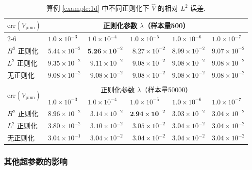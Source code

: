 \begin{table}[hbtp]
\centering
\footnotesize
\caption{算例 \ref{example:1d} 中不同正则化下 $\hat{V}$ 的相对 $L^{2}$ 误差.}
\begin{tabular}{lrrrrr}
\hline
\multirow{2}[0]{*}{$\text{err}(V_{\text{pinn}})$} & \multicolumn{5}{c}{正则化参数 $\lambda$（样本量500）} \\
\cline{2-6}
& \multicolumn{1}{l}{$1.0\times 10^{-3}$} & 
\multicolumn{1}{l}{$1.0\times 10^{-4}$} &
\multicolumn{1}{l}{$1.0\times 10^{-5}$} &
\multicolumn{1}{l}{$1.0\times 10^{-6}$} & 
\multicolumn{1}{l}{$1.0\times 10^{-7}$} \\
   \hline
$H^2$ 正则化 & $5.44\times 10^{-2}$ & $\textbf{5.26}\times \textbf{10}^{-2}$ & $8.27\times 10^{-2}$ & $8.99\times 10^{-2}$ & $9.07\times 10^{-2}$ \\
$L^2$ 正则化 & $9.35\times 10^{-2}$ & $9.11\times 10^{-2}$ & $9.08\times 10^{-2}$ & $9.08\times 10^{-2}$ & $9.08\times 10^{-2}$ \\
无正则化 & $9.08\times 10^{-2}$ & $9.08\times 10^{-2}$ & $9.08\times 10^{-2}$ & $9.08\times 10^{-2}$ & $9.08\times 10^{-2}$  \\
\hline
&       &       &       &       & \\
\hline
\multirow{2}[0]{*}{$\text{err}(V_{\text{pinn}})$} & \multicolumn{5}{c}{正则化参数 $\lambda$（样本量50000）} \\
\cline{2-6}
& \multicolumn{1}{l}{$1.0\times 10^{-3}$} & 
\multicolumn{1}{l}{$1.0\times 10^{-4}$} &
\multicolumn{1}{l}{$1.0\times 10^{-5}$} &
\multicolumn{1}{l}{$1.0\times 10^{-6}$} & 
\multicolumn{1}{l}{$1.0\times 10^{-7}$} \\
\hline
$H^2$ 正则化 & $8.96\times 10^{-2}$ & $3.14\times 10^{-2}$ & $\textbf{2.94}\times \textbf{10}^{-2}$ & $3.03\times 10^{-2}$ & $3.04\times 10^{-2}$  \\
$L^2$ 正则化 & $3.80\times 10^{-2}$ & $3.10\times 10^{-2}$ & $3.05\times 10^{-2}$ & $3.04\times 10^{-2}$ & $3.04\times 10^{-2}$ \\
无正则化 & $3.04\times 10^{-1}$ & $3.04\times 10^{-2}$ & $3.04\times 10^{-2}$ & $3.04\times 10^{-2}$ & $3.04\times 10^{-2}$ \\
\hline

\end{tabular}
\label{tab:regularization}
\end{table}

\subsubsection*{其他超参数的影响}

